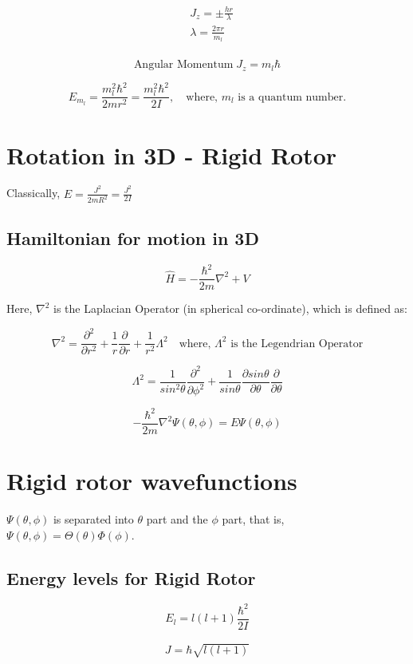 \documentclass[12pt]{article}
\theoremstyle{definition}
\theoremstyle{definition}
\begin{document}
\begin{align*}
	&J_z = \pm \frac{hr}{\lambda}\\
	&\lambda = \frac{2\pi r}{m_l}\\
\end{align*}

\[
	\textrm{Angular Momentum}\; J_z = m_l \hbar 
\]

\[
	E_{m_l} = \frac{m_l^2\hbar^2}{2mr^2} = \frac{m_l^2\hbar^2}{2I}, \quad \textrm{where, $m_l$ is a quantum number.}  
\]

\section{Rotation in 3D - Rigid Rotor}
Classically, $E = \frac{J^2}{2mR^2} = \frac{J^2}{2I}$  

\subsection{Hamiltonian for motion in 3D}
\[
	\hat{H} = - \frac{\hbar^2}{2m} \nabla^2 + V
\]

Here, $\nabla^2$ is the Laplacian Operator (in spherical co-ordinate), which is defined as:

\[
	\nabla^2 = \frac{\partial^2}{\partial r^2} + \frac{1}{r} \frac{\partial}{\partial r} + \frac{1}{r^2} \Lambda^2 \quad \textrm{where, $\Lambda^2$ is the Legendrian Operator}
\]

\[
	\Lambda^2 = \frac{1}{sin^2\theta} \frac{\partial^2}{\partial\phi^2} + \frac{1}{sin\theta} \frac{\partial sin\theta}{\partial \theta} \frac{\partial}{\partial\theta}  
\]

\[
	- \frac{\hbar^2}{2m} \nabla^2 \Psi(\theta, \phi) = E \Psi(\theta, \phi)
\]
\section{Rigid rotor wavefunctions}
$\Psi(\theta, \phi)$ is separated into $\theta$ part and the $\phi$ part, that is, $\varPsi(\theta, \phi) = \Theta(\theta)\Phi(\phi)$.

\subsection{Energy levels for Rigid Rotor}
\[
	E_l = l(l + 1) \frac{\hbar^2}{2I} 
\]

\begin{align*}
	J = \hbar \sqrt{l(l+1)}
\end{align*}
\end{document}
